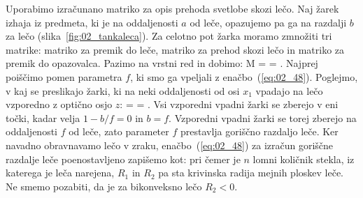 Uporabimo izračunano matriko za opis prehoda svetlobe skozi lečo. Naj žarek izhaja iz 
predmeta, ki je na oddaljenosti $a$ od leče, opazujemo pa ga na razdalji
$b$ za lečo (slika~\ref{fig:02_tankaleca}). Za celotno pot žarka moramo zmnožiti tri matrike: matriko za 
premik do leče, matriko za prehod skozi lečo in matriko za premik do opazovalca. Pazimo na vrstni red in dobimo:
\beq
M = 
\left[\begin{array}{cc}
1& b\\
0&1
\end{array}\right]\cdot
{}
\cdot
\left[\begin{array}{cc}
1& a\\
0&1
\end{array}\right]
= 
\!\!.
\label{eq:02_49}
\eeq
Najprej poiščimo pomen parametra $f$, ki smo ga vpeljali z enačbo~(\ref{eq:02_48}).
Poglejmo, v kaj se preslikajo žarki, ki na neki oddaljenosti od osi $x_1$ vpadajo na lečo 
vzporedno z optično osjo $z$:
\beq
{} =
 \cdot
\left[\begin{array}{c}
x_1\\
0
\end{array}\right] = 
\!\!.
\label{eq:02_51}
\eeq
Vsi vzporedni vpadni žarki se zberejo v eni točki, kadar velja $1-b/f = 0$ in $b=f$. 
Vzporedni vpadni žarki se torej zberejo na oddaljenosti $f$ od leče, zato 
parameter $f$ prestavlja goriščno razdaljo leče.
Ker navadno obravnavamo lečo v zraku, enačbo~(\ref{eq:02_48}) za izračun 
goriščne razdalje leče poenostavljeno zapišemo  kot:
pri čemer je $n$ lomni količnik stekla, iz katerega je leča narejena, $R_1$ in $R_2$ pa 
sta krivinska radija mejnih ploskev leče. Ne smemo pozabiti, da je za bikonveksno lečo $R_2 <0$.

